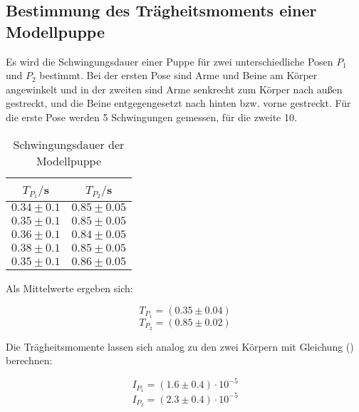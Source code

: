 \subsection{Bestimmung des Trägheitsmoments einer Modellpuppe}
Es wird die Schwingungsdauer einer Puppe für zwei unterschiedliche 
Posen $P_\text{1}$ und $P_\text{2}$ bestimmt. Bei der ersten Pose sind Arme und Beine am Körper angewinkelt und in der zweiten
sind Arme senkrecht zum Körper nach außen gestreckt, und die Beine entgegengesetzt nach hinten bzw. vorne gestreckt.
Für die erste Pose werden 5 Schwingungen gemessen, für die zweite 10.
\begin{table}[H]
  \centering
  \caption{Schwingungsdauer der Modellpuppe}
  \label{tab:Schwingungsdauer der Modellpuppe}
  \begin{tabular}{c c}
    \toprule
    $T_{P_1}/$s & $T_{P_2}/$s \\
    \midrule
    $0.34 \pm 0.1$ & $0.85 \pm 0.05$ \\
    $0.35 \pm 0.1$ & $0.85 \pm 0.05$ \\
    $0.36 \pm 0.1$ & $0.84 \pm 0.05$ \\
    $0.38 \pm 0.1$ & $0.85 \pm 0.05$ \\
    $0.35 \pm 0.1$ & $0.86 \pm 0.05$ \\
    \bottomrule
  \end{tabular}
\end{table}

Als Mittelwerte ergeben sich:

\begin{equation}
T_{P_1} = (0.35 \pm 0.04) 
\end{equation}
\begin{equation}
T_{P_2}= (0.85 \pm 0.02) 
\end{equation}

Die Trägheitsmomente lassen sich analog zu den zwei Körpern mit Gleichung () berechnen:

\begin{equation}
I_{P_1}  = (1.6 \pm 0.4)\cdot 10^{-5} 
\end{equation}
\begin{equation}
I_{P_2}  = (2.3 \pm 0.4)\cdot 10^{-5}
\end{equation}




